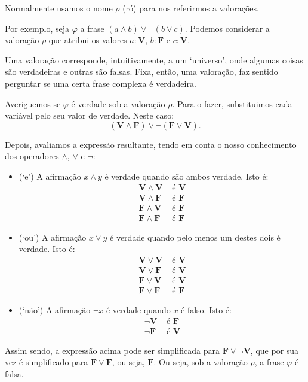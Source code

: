 \documentclass{article}
\theoremstyle{definition}
\theoremstyle{remark}
\newcommand{\V}{\mathbf{V}}
\newcommand{\F}{\mathbf{F}}
\begin{document}
	Normalmente usamos o nome $\rho$ (ró) para nos referirmos a valorações.
	
	Por exemplo, seja $\varphi$ a frase $(a \land b) \lor \neg (b \lor c)$. Podemos considerar a valoração $\rho$ que atribui os valores $a:\V$, $b:\F$ e $c:\V$.
	
	Uma valoração corresponde, intuitivamente, a um `universo', onde algumas coisas são verdadeiras e outras são falsas. Fixa, então, uma valoração, faz sentido perguntar se uma certa frase complexa é verdadeira.
	
	Averiguemos se $\varphi$ é verdade sob a valoração $\rho$. Para o fazer, substituimos cada variável pelo seu valor de verdade. Neste caso:
	\[(\V \land \F) \lor \neg (\F \lor \V).\]
	
	Depois, avaliamos a expressão resultante, tendo em conta o nosso conhecimento dos operadores $\land$, $\lor$ e $\neg$:
	
	\begin{itemize}
	\item (`e') A afirmação $x \land y$ é verdade quando são ambos verdade. Isto é:
	\begin{align*}
	\V \land \V &\text{ é } \V\\
	\V \land \F &\text{ é } \F\\
	\F \land \V &\text{ é } \F\\
	\F \land \F &\text{ é } \F
	\end{align*}
	
	\item (`ou') A afirmação $x \lor y$ é verdade quando pelo menos um destes dois é verdade. Isto é:
	\begin{align*}
	\V \lor \V &\text{ é } \V\\
	\V \lor \F &\text{ é } \V\\
	\F \lor \V &\text{ é } \V\\
	\F \lor \F &\text{ é } \F
	\end{align*}
	
	\item (`não') A afirmação $\neg x$ é verdade quando $x$ é falso. Isto é:
	\begin{align*}
	\neg \V &\text{ é } \F\\
	\neg \F &\text{ é } \V
	\end{align*}
	\end{itemize}
	
	Assim sendo, a expressão acima pode ser simplificada para $\F \lor \neg \V$, que por sua vez é simplificado para $\F \lor \F$, ou seja, $\F$. Ou seja, sob a valoração $\rho$, a frase $\varphi$ é falsa.
	
\end{document}
